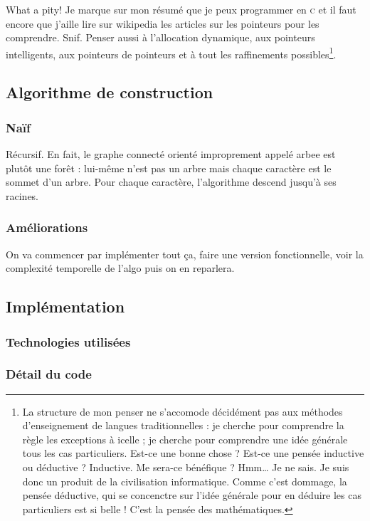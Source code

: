 \documentclass[12pt,onecolumn]{article} %
\begin{document}
What a pity! Je marque sur mon résumé que je peux programmer en \textsc{c} et il faut encore que j'aille lire sur wikipedia les articles sur les pointeurs pour les comprendre. Snif. Penser aussi à l'allocation dynamique, aux pointeurs intelligents, aux pointeurs de pointeurs et à tout les raffinements possibles\footnote{La structure de mon penser ne s'accomode décidément pas aux méthodes d'enseignement de langues traditionnelles : je cherche pour comprendre la règle les exceptions à icelle ; je cherche pour comprendre une idée générale tous les cas particuliers. Est-ce une bonne chose ? Est-ce une pensée inductive ou déductive ? Inductive. Me sera-ce bénéfique ? Hmm… Je ne sais. Je suis donc un produit de la civilisation informatique. Comme c'est dommage, la pensée déductive, qui se concenctre sur l'idée générale pour en déduire les cas particuliers est si belle ! C'est la pensée des mathématiques.}.

\subsection{Algorithme de construction}

\subsubsection{Naïf}

Récursif. En fait, le graphe connecté orienté improprement appelé arbee est plutôt une forêt : lui-même n'est pas un arbre mais chaque caractère est le sommet d'un arbre. Pour chaque caractère, l'algorithme descend jusqu'à ses racines.

\subsubsection{Améliorations}

On va commencer par implémenter tout ça, faire une version fonctionnelle, voir la complexité temporelle de l'algo puis on en reparlera.

\subsection{Implémentation}

\subsubsection{Technologies utilisées}

\subsubsection{Détail du code}
\end{document}
